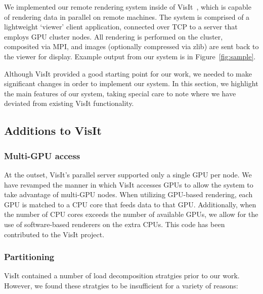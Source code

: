 We implemented our remote rendering system inside of
VisIt~\cite{Childs:???:???}, which is capable of rendering data in
parallel on remote machines.  The system is comprised of a lightweight
`viewer' client application, connected over TCP to a server that
employs GPU cluster nodes.  All rendering is performed on the cluster,
composited via MPI, and images (optionally compressed via zlib) are
sent back to the viewer for display.  Example output from our system is
in Figure~\ref{fig:sample}.

Although VisIt provided a good starting point for our work, we needed
to make significant changes in order to implement our system.  In this
section, we highlight the main features of our system, taking special
care to note where we have deviated from existing VisIt functionality.

\subsection{Additions to VisIt}

\subsubsection{Multi-GPU access}

At the outset, VisIt's parallel server supported only a single GPU per
node.  We have revamped the manner in which VisIt accesses GPUs to
allow the system to take advantage of multi-GPU nodes.  When utilizing
GPU-based rendering, each GPU is matched to a CPU core that feeds
data to that GPU.  Additionally, when the number of CPU cores exceeds
the number of available GPUs, we allow for the use of software-based
renderers on the extra CPUs.  This code has been contributed to the
VisIt project.

\subsubsection{Partitioning}

VisIt contained a number of load decomposition stratgies prior to our
work.  However, we found these stratgies to be insufficient for a
variety of reasons:

